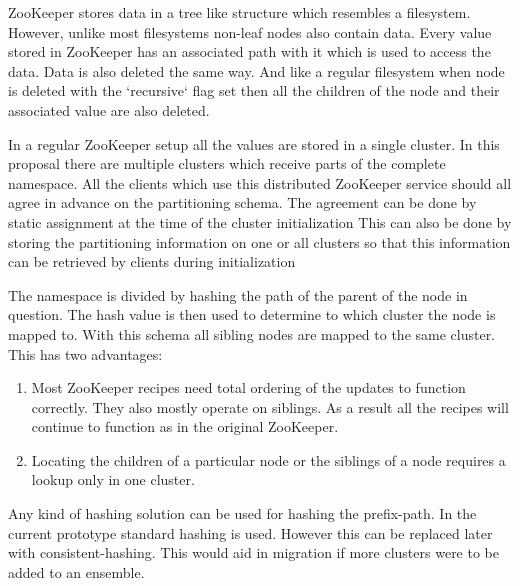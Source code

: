 \documentclass[11pt]{article}
\begin{document}
ZooKeeper stores data in a tree like structure which resembles a filesystem. However, unlike most filesystems non-leaf nodes also contain data. Every value stored in ZooKeeper has an associated path with it which is used to access the data. Data is also deleted the same way. And like a regular filesystem when node is deleted with the `recursive` flag set then all the children of the node and their associated value are also deleted.

In a regular ZooKeeper setup all the values are stored in a single cluster. In this proposal there are multiple clusters which receive parts of the complete namespace. All the clients which use this distributed ZooKeeper service should all agree in advance on the partitioning schema. The agreement can be done by static assignment at the time of the cluster initialization This can also be done by storing the partitioning information on one or all clusters so that this information can be retrieved by clients during initialization

The namespace is divided by hashing the path of the parent of the node in question. The hash value is then used to determine to which cluster the node is mapped to. With this schema all sibling nodes are mapped to the same cluster. This has two advantages:
\begin{enumerate}
  \item Most ZooKeeper recipes need total ordering of the updates to function correctly. They also mostly operate on siblings. As a result all the recipes will continue to function as in the original ZooKeeper.
  \item Locating the children of a particular node or the siblings of a node requires a lookup only in one cluster.
\end{enumerate}

Any kind of hashing solution can be used for hashing the prefix-path. In the current prototype standard hashing is used. However this can be replaced later with consistent-hashing. This would aid in migration if more clusters were to be added to an ensemble.
\end{document}
